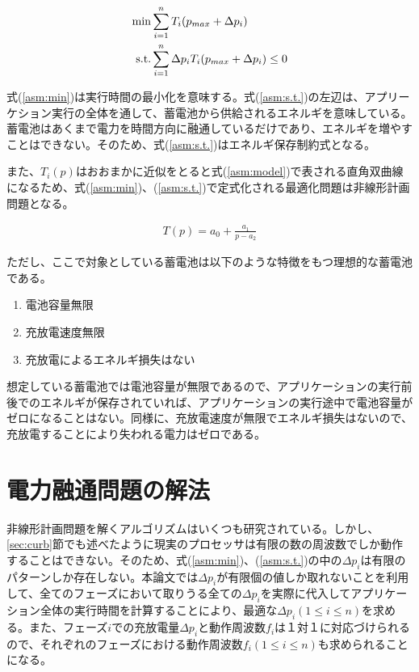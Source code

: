 \begin{eqnarray}
{\rm min } & \sum_{i=1}^n T_i(p_{max} + \Delta p_i) \label{asm:min} \\
{\rm s.t. } & \sum_{i=1}^n \Delta p_i T_i(p_{max} + \Delta p_i) \leq 0 \label{asm:s.t.}
\end{eqnarray}

式(\ref{asm:min})は実行時間の最小化を意味する。式(\ref{asm:s.t.})の左辺は、アプリーケション実行の全体を通して、蓄電池から供給されるエネルギを意味している。蓄電池はあくまで電力を時間方向に融通しているだけであり、エネルギを増やすことはできない。そのため、式(\ref{asm:s.t.})はエネルギ保存制約式となる。

また、$T_i(p)$はおおまかに近似をとると式(\ref{asm:model})で表される直角双曲線になるため、式(\ref{asm:min})、(\ref{asm:s.t.})で定式化される最適化問題は非線形計画問題となる。

\begin{eqnarray}
T(p) = a_0 + \frac{a_1}{p-a_2} \label{asm:model}
\end{eqnarray}

ただし、ここで対象としている蓄電池は以下のような特徴をもつ理想的な蓄電池である。

\begin{enumerate}
\item 電池容量無限
\item 充放電速度無限
\item 充放電によるエネルギ損失はない
\end{enumerate}

想定している蓄電池では電池容量が無限であるので、アプリケーションの実行前後でのエネルギが保存されていれば、アプリケーションの実行途中で電池容量がゼロになることはない。同様に、充放電速度が無限でエネルギ損失はないので、充放電することにより失われる電力はゼロである。


\section{電力融通問題の解法}
\label{sec:algorithm}

非線形計画問題を解くアルゴリズムはいくつも研究されている。しかし、\ref{sec:curb}節でも述べたように現実のプロセッサは有限の数の周波数でしか動作することはできない。そのため、式(\ref{asm:min})、(\ref{asm:s.t.})の中の$\Delta p_i$は有限のパターンしか存在しない。本論文では$\Delta p_i$が有限個の値しか取れないことを利用して、全てのフェーズにおいて取りうる全ての$\Delta p_i$を実際に代入してアプリケーション全体の実行時間を計算することにより、最適な$\Delta p_i(1 \leq i \leq n)$を求める。また、フェーズ$i$での充放電量$\Delta p_i$と動作周波数$f_i$は１対１に対応づけられるので、それぞれのフェーズにおける動作周波数$f_i(1 \leq i \leq n)$も求められることになる。







